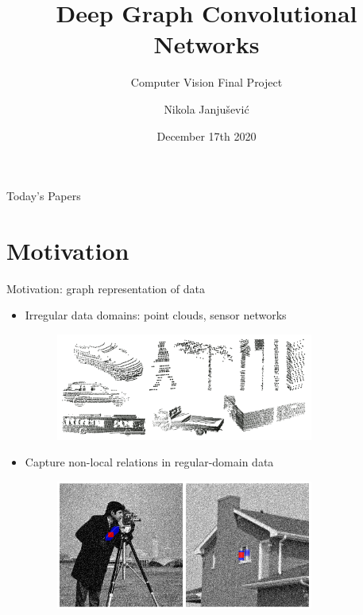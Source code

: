 \documentclass{beamer}
\title{Deep Graph Convolutional Networks}
\subtitle{Computer Vision Final Project}
\author{Nikola Janju\v{s}evi\'{c}}
\institute{NYU}
\date{December 17th 2020}
\begin{document}
\frame{\titlepage}

\newcommand{\mycite}[1]{\textit{\citetitle{#1}} \cite{#1}}
\begin{frame}{Today's Papers}
\begin{refsection}
	\nocite{*}
	\printbibliography[keyword=myprez]
\end{refsection}
\end{frame}

\section{Motivation}
\begin{frame}[allowframebreaks]{Motivation: graph representation of data}
\begin{itemize}
\item Irregular data domains: point clouds, sensor networks
	\begin{figure}[H]
	\includegraphics[width=0.8\textwidth]{../imgs/point_cloud.png}
	\caption{\cite{Simonovsky2017ecc}}
	\end{figure}

\newpage
\item Capture non-local relations in regular-domain data
	\begin{figure}[H]
	\includegraphics[width=0.8\textwidth]{../imgs/bm3d.png}
	\caption{\cite{BM3D}}
	\end{figure}
\end{itemize}
\end{frame}
\end{document}
